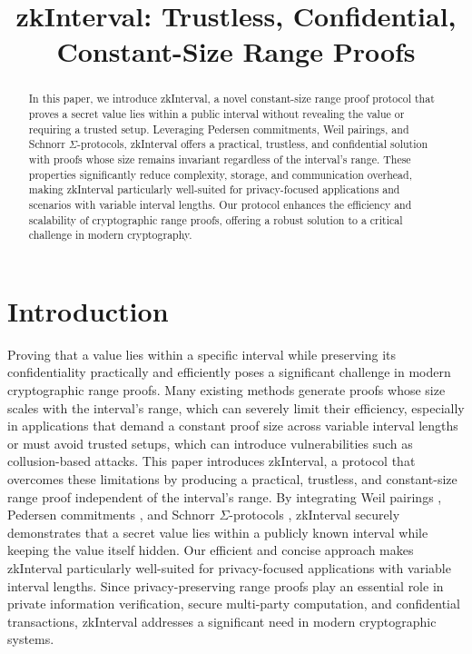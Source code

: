 \documentclass{iacrcc}
\title[running  = {zkInterval},
      ]{zkInterval: Trustless, Confidential, Constant-Size Range Proofs}
\theoremstyle{definition}
\begin{document}
\maketitle

\begin{abstract}
  In this paper, we introduce zkInterval, a novel constant-size range proof protocol that proves a secret value lies within a public interval without revealing the value or requiring a trusted setup. Leveraging Pedersen commitments, Weil pairings, and Schnorr $\Sigma$-protocols, zkInterval offers a practical, trustless, and confidential solution with proofs whose size remains invariant regardless of the interval's range. These properties significantly reduce complexity, storage, and communication overhead, making zkInterval particularly well-suited for privacy-focused applications and scenarios with variable interval lengths. Our protocol enhances the efficiency and scalability of cryptographic range proofs, offering a robust solution to a critical challenge in modern cryptography.
\end{abstract}

\begin{textabstract}
\end{textabstract}

\section{Introduction}

Proving that a value lies within a specific interval while preserving its confidentiality practically and efficiently poses a significant challenge in modern cryptographic range proofs. Many existing methods generate proofs whose size scales with the interval's range, which can severely limit their efficiency, especially in applications that demand a constant proof size across variable interval lengths or must avoid trusted setups, which can introduce vulnerabilities such as collusion-based attacks. This paper introduces zkInterval, a protocol that overcomes these limitations by producing a practical, trustless, and constant-size range proof independent of the interval's range. By integrating Weil pairings \cite[pp.62--63]{menezes1993}, Pedersen commitments \cite{pedersen1991}, and Schnorr $\Sigma$-protocols \cite[pp.310--311]{thaler2022}, zkInterval securely demonstrates that a secret value lies within a publicly known interval while keeping the value itself hidden. Our efficient and concise approach makes zkInterval particularly well-suited for privacy-focused applications with variable interval lengths. Since privacy-preserving range proofs play an essential role in private information verification, secure multi-party computation, and confidential transactions, zkInterval addresses a significant need in modern cryptographic systems.
\end{document}
